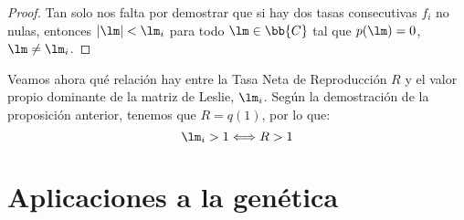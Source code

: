 \begin{prop}
\begin{proof}
    Tan solo nos falta por demostrar que si hay dos tasas consecutivas $f_i$ no nulas, entonces $|\lm|<\lm_i$ para todo $\lm\in \bb{C}$ tal que $p(\lm)=0$, $\lm\neq \lm_i$.
\end{proof}
\end{prop}

Veamos ahora qué relación hay entre la Tasa Neta de Reproducción $R$ y el valor propio dominante de la matriz de Leslie, $\lm_i$. Según la demostración de la proposición anterior, tenemos que $R=q(1)$, por lo que:
\begin{equation*}
    \lm_i > 1 \Longleftrightarrow R>1
\end{equation*}


\section{Aplicaciones a la genética}

